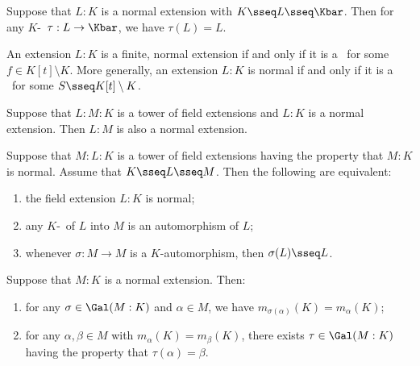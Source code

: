 \documentclass{article}
\begin{document}
  \begin{tproposition}
    Suppose that \( L:K \) is a normal extension with \( K\sseq L\sseq \Kbar \).
    Then for any \( K \)-\homo~\( \tau:L\to \Kbar \), we have \( \tau(L) = L \).
  \end{tproposition}

  \begin{tproposition}
    An extension \( L:K \) is a finite, normal extension if and only if it is a \sfe~for some \( f\in K[t]\setminus K \).
    More generally, an extension \( L:K \) is normal if and only if it is a \sfe~for some \( S\sseq K[t]\setminus K \).
  \end{tproposition}

  \begin{tproposition}
    Suppose that \( L:M:K \) is a tower of field extensions and \( L:K \) is a normal extension.
    Then \( L:M \) is also a normal extension.
  \end{tproposition}

  \begin{ttheorem}
    Suppose that \( M:L:K \) is a tower of field extensions having the property that \( M:K \) is normal.
    Assume that \( K\sseq L\sseq M \).
    Then the following are equivalent: \begin{enumerate}[label=(\roman*)]
      \item the field extension \( L:K \) is normal;
      \item any \( K \)-\homo~of \( L \) into \( M \) is an automorphism of \( L \);
      \item whenever \( \sigma:M\to M \) is a \( K \)-automorphism, then \( \sigma(L)\sseq L \).
    \end{enumerate}
  \end{ttheorem}

  \begin{tproposition}
    Suppose that \( M:K \) is a normal extension.
    Then: \begin{enumerate}[label=(\alph*)]
      \item for any \( \sigma\in\Gal(M:K) \) and \( \alpha\in M \), we have \( m_{\sigma(\alpha)}(K)=m_\alpha(K) \);
      \item for any \( \alpha,\beta\in M \) with \( m_\alpha(K)=m_\beta(K) \), there exists \( \tau\in\Gal(M:K) \) having the property that \( \tau(\alpha)=\beta \).
    \end{enumerate}
  \end{tproposition}
\end{document}
